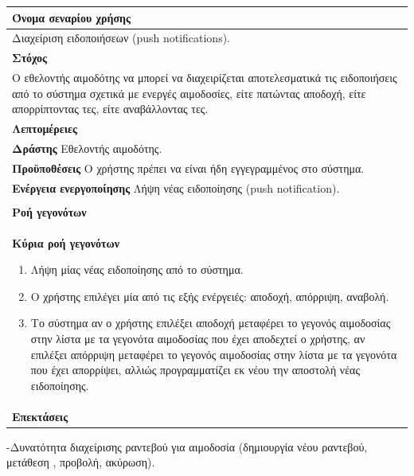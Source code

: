 \begin{center}
    \begin{tabular}{|p{\dimexpr \linewidth-2\tabcolsep}|}
    \hline
    \rowcolor{grayy}
    \textbf{Όνομα σεναρίου χρήσης}
    \\ \hline    
     Διαχείριση ειδοποιήσεων (push notifications).
     \\ \hline
    \rowcolor{grayy}
    \textbf{\textbf{Στόχος}}
    \\ \hline
 	 Ο εθελοντής αιμοδότης να μπορεί να διαχειρίζεται αποτελεσματικά τις ειδοποιήσεις από το σύστημα σχετικά με ενεργές αιμοδοσίες, είτε πατώντας αποδοχή,  είτε απορρίπτοντας τες, είτε αναβάλλοντας τες.
    \\ \hline
    \rowcolor{grayy}
    \textbf{Λεπτομέρειες}
    \\ \hline
	\textbf{Δράστης} Εθελοντής αιμοδότης.
	\\*
	\textbf{Προϋποθέσεις} Ο χρήστης πρέπει να είναι ήδη εγγεγραμμένος στο σύστημα.
	\\*
	\textbf{Ενέργεια ενεργοποίησης} Λήψη νέας ειδοποίησης (push notification).
	\\ \hline
    \\ \hline
	\rowcolor{grayy}    
    \textbf{Ροή γεγονότων}
    \\* 
	\textbf{Κύρια ροή γεγονότων}
	\begin{enumerate}
	\item	Λήψη μίας νέας ειδοποίησης από το σύστημα.
	\item  Ο χρήστης επιλέγει μία από τις εξής ενέργειές: αποδοχή, απόρριψη, αναβολή.
	\item Το σύστημα αν ο χρήστης επιλέξει αποδοχή μεταφέρει το γεγονός αιμοδοσίας στην λίστα με τα γεγονότα αιμοδοσίας που έχει αποδεχτεί ο χρήστης, αν επιλέξει απόρριψη μεταφέρει το γεγονός αιμοδοσίας στην λίστα με τα γεγονότα που έχει απορρίψει, αλλιώς προγραμματίζει εκ νέου την αποστολή νέας ειδοποίησης.
	\end{enumerate}
	\\*
	\textbf{Επεκτάσεις}
	   \\ \hline
    \end{tabular}
\end{center}			
			
			
-Δυνατότητα διαχείρισης ραντεβού για αιμοδοσία (δημιουργία νέου ραντεβού, μετάθεση , προβολή, ακύρωση).


